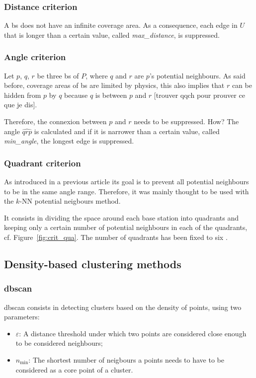 \documentclass[lettersize,journal,english]{IEEEtran}
\begin{document}
\subsubsection{Distance criterion\cite{patent_neighs}}
A \acrshort{bs} does not have an infinite coverage area.
As a consequence, each edge in $U$ that is longer than a certain value, called \emph{max\_distance}, is suppressed.

\subsubsection{Angle criterion}
Let $p$, $q$, $r$ be three \acrshort{bs} of $P$, where $q$ and $r$ are $p$'s potential neighbours. As said before, coverage areas of \acrshort{bs} are limited by physics, this also implies that $r$ can be \og hidden\fg{} from $p$ by $q$ because $q$ is between $p$ and $r$ [trouver qqch pour prouver ce que je dis].

Therefore, the connexion between $p$ and $r$ needs to be suppressed. How? The angle $\widehat{qrp}$ is calculated and if it is narrower than a certain value, called \emph{min\_angle}, the longest edge is suppressed.

\subsubsection{Quadrant criterion}
As introduced in a previous article \cite{10201211} its goal is to prevent all potential neighbours to be in the same angle range. Therefore, it was mainly thought to be used with the 
$k$-NN potential neigbours method.

It consists in dividing the space around each base station into quadrants and keeping only a certain number of potential neighbours
in each of the quadrants, cf. Figure~\ref{fig:crit_qua}.
The number of quadrants has been fixed to six \cite{art_del_paq}.

\subsection{Density-based clustering methods}
\subsubsection{\acrshort{dbscan}}
\acrshort{dbscan} consists in detecting clusters based on the density of points, using two parameters:
\begin{itemize}
    \item \emph{$\varepsilon$}: A distance threshold under which two points are considered close enough to be considered neighbours;   
    \item \emph{$n_{\text{min}}$}: The shortest number of neigbours a points needs to have to be considered as a core point of a cluster.
\end{itemize}
\end{document}
